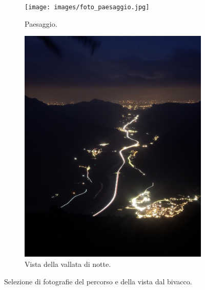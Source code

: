 \documentclass{article}
\begin{document}
\begin{figure}[htbp!]
    \begin{subfigure}{0.45\textwidth}
        \centering
        \texttt{[image: images/foto\_paesaggio.jpg]}
        \caption{Paesaggio.}
        \label{fig:foto3}
    \end{subfigure}
    \hfill 
    \begin{subfigure}{0.45\textwidth}
        \centering
        \includegraphics[width=\linewidth]{images/foto_vallataNotte.jpg}
        \caption{Vista della vallata di notte.}
        \label{fig:foto4}
    \end{subfigure}

    \caption{Selezione di fotografie del percorso e della vista dal bivacco.}
    \label{fig:panoramica_4_foto}
\end{figure}
\end{document}
